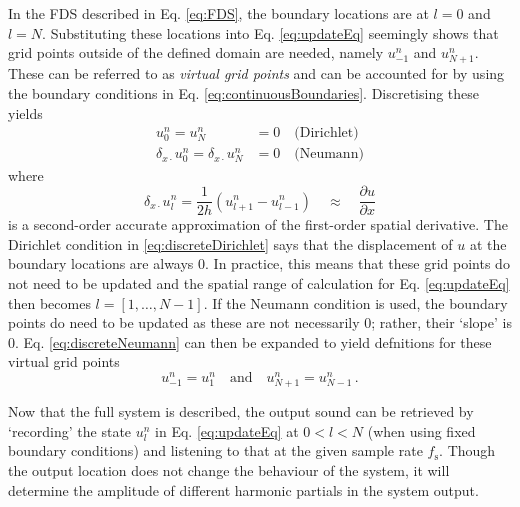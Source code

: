 In the FDS described in Eq. \eqref{eq:FDS}, the boundary locations are at $l = 0$ and $l = N$. Substituting these locations into Eq. \eqref{eq:updateEq} seemingly shows that grid points outside of the defined domain are needed, namely $u_{-1}^n$ and $u_{N+1}^n$. These can be referred to as \textit{virtual grid points} and can be accounted for %
by using the boundary conditions in Eq. \eqref{eq:continuousBoundaries}. Discretising these yields
\begin{subequations}
    \begin{align}
        u_0^n = u_N^n &= 0 \quad\text{(Dirichlet)}\label{eq:discreteDirichlet}\\
        \delta_{x\cdot} u_0^n = \delta_{x\cdot} u_N^n &= 0 \quad \text{(Neumann)}\label{eq:discreteNeumann}
    \end{align}
\end{subequations}
where 
\begin{equation}
    \delta_{x\cdot}u_l^n = \frac{1}{2h}\left(u_{l+1}^n - u_{l-1}^n\right)\quad \approx\quad \frac{\partial u}{\partial x}
\end{equation}
is a second-order accurate approximation of the first-order spatial derivative. The Dirichlet condition in \eqref{eq:discreteDirichlet} says that the displacement of $u$ at the boundary locations are always 0. In practice, this means that these grid points do not need to be updated and the spatial range of calculation for Eq. \eqref{eq:updateEq} then becomes $l = [1, \hdots, N-1]$. If the Neumann condition is used, the boundary points do need to be updated as these are not necessarily $0$; rather, their `slope' is $0$. Eq. \eqref{eq:discreteNeumann} can then be expanded to yield defnitions for these virtual grid points
\begin{equation}\label{eq:neumannSolution}
    u_{-1}^n = u_1^n \quad \text{and} \quad u_{N+1}^n = u_{N-1}^n\,.
\end{equation}

Now that the full system is described, the output sound can be retrieved by `recording' the state $u_l^n$ in Eq. \eqref{eq:updateEq} at $0 < l < N$ (when using fixed boundary conditions) and listening to that at the given sample rate $f_\text{s}$. Though the output location does not change the behaviour of the system, it will determine the amplitude of different harmonic partials in the system output.

